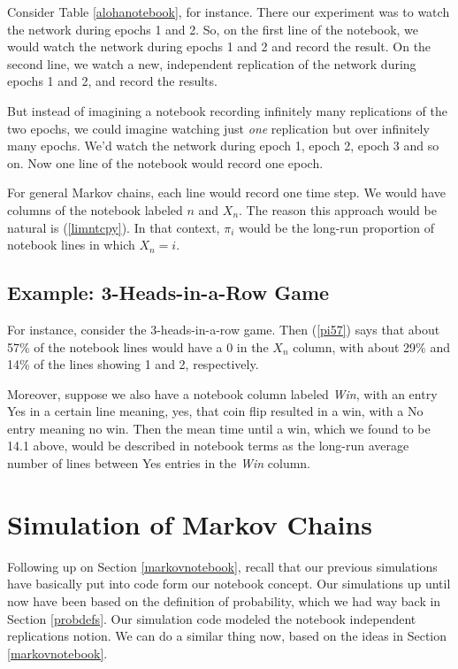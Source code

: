 Consider Table \ref{alohanotebook}, for instance.  There our experiment
was to watch the network during epochs 1 and 2.  So, on the first line
of the notebook, we would watch the network during epochs 1 and 2 and
record the result.  On the second line, we watch a new, independent
replication of the network during epochs 1 and 2, and record the
results.

But instead of imagining a notebook recording infinitely many
replications of the two epochs, we could imagine watching just {\it one}
replication but over infinitely many epochs.  We'd watch the network
during epoch 1, epoch 2, epoch 3 and so on.  Now one line of the
notebook would record one epoch.  

For general Markov chains, each line would record one time step.  We
would have columns of the notebook labeled $n$ and $X_n$.  The reason
this approach would be natural is (\ref{limntcpy}).  In that context,
$\pi_i$ would be the long-run proportion of notebook lines in which $X_n
= i$.

\subsection{Example:  3-Heads-in-a-Row Game}

For instance, consider the 3-heads-in-a-row game.  Then (\ref{pi57})
says that about 57\% of the notebook lines would have a 0 in the $X_n$
column, with about 29\% and 14\% of the lines showing 1 and 2,
respectively.

Moreover, suppose we also have a notebook column labeled {\it Win}, with
an entry Yes in a certain line meaning, yes, that coin flip resulted in
a win, with a No entry meaning no win.  Then the mean time until a win,
which we found to be 14.1 above, would be described in notebook terms as
the long-run average number of lines between Yes entries in the {\it
Win} column.

\section{Simulation of Markov Chains}

Following up on Section \ref{markovnotebook}, recall that our previous
simulations have basically put into code form our notebook concept.  Our
simulations up until now have been based on the definition of
probability, which we had way back in Section \ref{probdefs}.  Our
simulation code modeled the notebook independent replications notion.
We can do a similar thing now, based on the ideas in Section
\ref{markovnotebook}.

